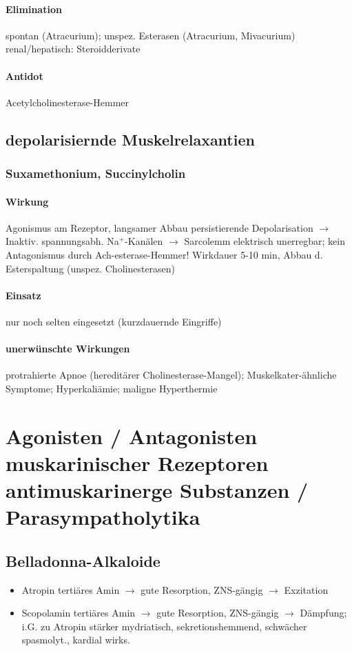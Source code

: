 \documentclass[10pt,a4paper]{report}
\begin{document}
\paragraph{Elimination}spontan (Atracurium); unspez. Esterasen (Atracurium, Mivacurium) renal/hepatisch: Steroidderivate
\paragraph{Antidot} Acetylcholinesterase-Hemmer
\subsection{depolarisiernde Muskelrelaxantien}
\subsubsection{Suxamethonium, Succinylcholin}
\paragraph{Wirkung} Agonismus am Rezeptor, langsamer Abbau persistierende Depolarisation $\rightarrow$ Inaktiv. spannungsabh. Na$^+$-Kanälen $\rightarrow$ Sarcolemm elektrisch unerregbar; kein Antagonismus durch Ach-esterase-Hemmer! Wirkdauer 5-10 min, Abbau d. Esterspaltung (unspez. Cholinesterasen)
\paragraph{Einsatz}  nur noch selten eingesetzt (kurzdauernde Eingriffe)
\paragraph{unerwünschte Wirkungen} protrahierte Apnoe (hereditärer Cholinesterase-Mangel); Muskelkater-ähnliche Symptome; Hyperkaliämie;  maligne Hyperthermie
\section{Agonisten / Antagonisten muskarinischer Rezeptoren
antimuskarinerge Substanzen / Parasympatholytika}
\subsection{Belladonna-Alkaloide}
\begin{itemize}
	\item Atropin tertiäres Amin $\rightarrow$ gute Resorption, ZNS-gängig $\rightarrow$ Exzitation
	\item Scopolamin tertiäres Amin $\rightarrow$ gute Resorption, ZNS-gängig
$\rightarrow$ Dämpfung; i.G. zu Atropin stärker mydriatisch, sekretionshemmend, schwächer spasmolyt., kardial wirks.
\end{itemize}
\end{document}

